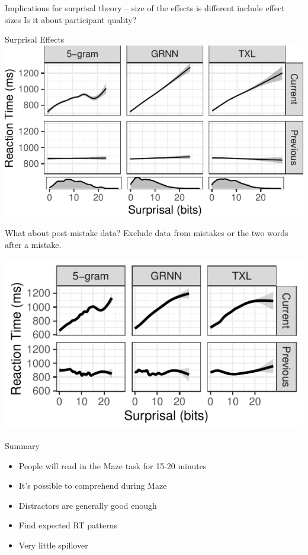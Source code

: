 \documentclass[12pt, xcolor=beamer,table,usenames,dvipsnames, ignorenonframetext, ngerman,t]{beamer}
\begin{document}
\begin{frame}
	Implications for surprisal theory -- size of the effects is different
	include effect sizes
	Is it about participant quality?
\end{frame}

\begin{frame}{Surprisal Effects}
\includegraphics[width=.9\textwidth]{../gam.pdf}	
\end{frame}
\begin{frame}{What about post-mistake data?}
Exclude data from mistakes or the two words after a mistake. 

\includegraphics[width=.9\textwidth]{../gam2.pdf}	
\end{frame}

\begin{frame}{Summary}
\begin{itemize}\pause
	\item People will read in the Maze task for 15-20 minutes \pause
	\item It's possible to comprehend during Maze \pause
	\item Distractors are generally good enough \pause
	\item Find expected RT patterns \pause
	\item Very little spillover
\end{itemize}
\end{frame}
\end{document}
